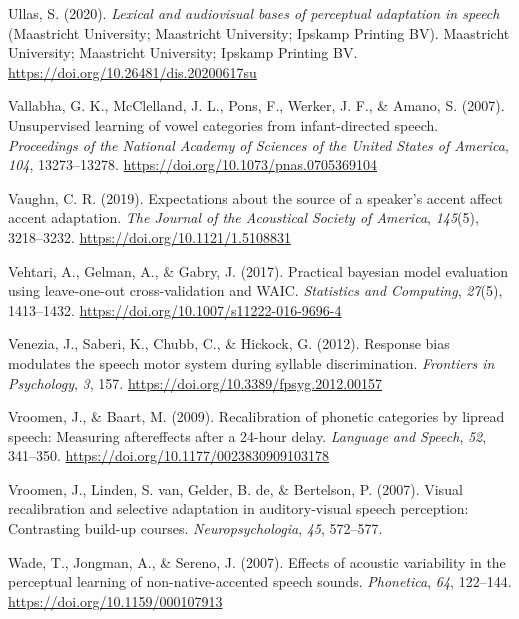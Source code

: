 \documentclass[
  11pt,
  man,floatsintext]{apa6}
\newlength{\cslhangindent}
\newlength{\cslentryspacingunit} %
\newenvironment{CSLReferences}[2] %
 {%
  \setlength{\parindent}{0pt}
  \ifodd #1
  \let\oldpar\par
  \def\par{\hangindent=\cslhangindent\oldpar}
  \fi
  \setlength{\parskip}{#2\cslentryspacingunit}
 }%
 {}
\begin{document}
\begin{CSLReferences}{1}{0}
\leavevmode{}%
Ullas, S. (2020). \emph{Lexical and audiovisual bases of perceptual adaptation in speech} (Maastricht University; Maastricht University; Ipskamp Printing BV). Maastricht University; Maastricht University; Ipskamp Printing BV. \url{https://doi.org/10.26481/dis.20200617su}

\leavevmode{}%
Vallabha, G. K., McClelland, J. L., Pons, F., Werker, J. F., \& Amano, S. (2007). Unsupervised learning of vowel categories from infant-directed speech. \emph{Proceedings of the National Academy of Sciences of the United States of America}, \emph{104}, 13273--13278. \url{https://doi.org/10.1073/pnas.0705369104}

\leavevmode{}%
Vaughn, C. R. (2019). Expectations about the source of a speaker's accent affect accent adaptation. \emph{The Journal of the Acoustical Society of America}, \emph{145}(5), 3218--3232. \url{https://doi.org/10.1121/1.5108831}

\leavevmode{}%
Vehtari, A., Gelman, A., \& Gabry, J. (2017). Practical bayesian model evaluation using leave-one-out cross-validation and WAIC. \emph{Statistics and Computing}, \emph{27}(5), 1413--1432. \url{https://doi.org/10.1007/s11222-016-9696-4}

\leavevmode{}%
Venezia, J., Saberi, K., Chubb, C., \& Hickock, G. (2012). Response bias modulates the speech motor system during syllable discrimination. \emph{Frontiers in Psychology}, \emph{3}, 157. \url{https://doi.org/10.3389/fpsyg.2012.00157}

\leavevmode{}%
Vroomen, J., \& Baart, M. (2009). Recalibration of phonetic categories by lipread speech: Measuring aftereffects after a 24-hour delay. \emph{Language and Speech}, \emph{52}, 341--350. \url{https://doi.org/10.1177/0023830909103178}

\leavevmode{}%
Vroomen, J., Linden, S. van, Gelder, B. de, \& Bertelson, P. (2007). Visual recalibration and selective adaptation in auditory-visual speech perception: Contrasting build-up courses. \emph{Neuropsychologia}, \emph{45}, 572--577.

\leavevmode{}%
Wade, T., Jongman, A., \& Sereno, J. (2007). Effects of acoustic variability in the perceptual learning of non-native-accented speech sounds. \emph{Phonetica}, \emph{64}, 122--144. \url{https://doi.org/10.1159/000107913}


\end{CSLReferences}
\end{document}

